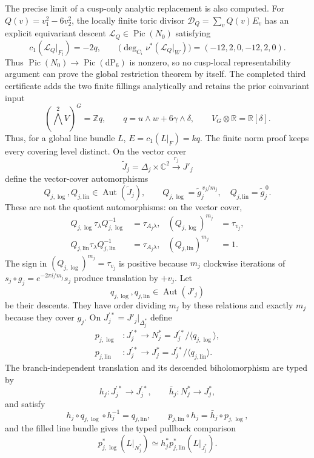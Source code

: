 \begin{enumerate}[leftmargin=1.8em,itemsep=.65em]
The precise limit of a cusp-only analytic replacement is also computed.
For $Q(v)=v_1^2-6v_2^2$, the locally finite toric divisor
$\mathcal D_Q=\sum_vQ(v)E_v$ has an explicit equivariant descent
$\mathcal L_Q\in\operatorname{Pic}(N_0)$ satisfying
\[
 c_1(\mathcal L_Q|_{F_t})=-2q,\qquad
 \bigl(\deg_{C_i}\nu^*(\mathcal L_Q|_W)\bigr)
 =(-12,2,0,-12,2,0).
\]
Thus $\operatorname{Pic}(N_0)\to\operatorname{Pic}(\mathrm{dP}_6)$ is
nonzero, so no cusp-local representability argument can prove the global
restriction theorem by itself.  The completed third certificate adds the two
finite fillings analytically and retains the prior coinvariant input
\[
 (\textstyle\bigwedge^2V)^G=\mathbb Zq,\qquad
 q=u\wedge w+6\gamma\wedge\delta,\qquad
 V_G\otimes\mathbb R=\mathbb R[\delta].
\]
Thus, for a global line bundle $L$,
$E=c_1(L|_F)=kq$.  The finite norm proof keeps every covering level
distinct.  On the vector cover
\[
 \widetilde J_j=\Delta_j\times\mathbb C^2
 \xrightarrow{\ r_j\ }J'_j
\]
define the vector-cover automorphisms
\[
 Q_{j,\log},Q_{j,\mathrm{lin}}\in\operatorname{Aut}(\widetilde J_j),
 \qquad
 Q_{j,\log}=\widetilde g_j^{\,v_j/m_j},\quad
 Q_{j,\mathrm{lin}}=\widetilde g_j^{\,0}.
\]
These are not the quotient automorphisms: on the vector cover,
\[
\begin{aligned}
 Q_{j,\log}\tau_\lambda Q_{j,\log}^{-1}
 &=\tau_{A_j\lambda},&
 (Q_{j,\log})^{m_j}&=\tau_{v_j},\\
 Q_{j,\mathrm{lin}}\tau_\lambda Q_{j,\mathrm{lin}}^{-1}
 &=\tau_{A_j\lambda},&
 (Q_{j,\mathrm{lin}})^{m_j}&=1.
\end{aligned}
\]
The sign in $(Q_{j,\log})^{m_j}=\tau_{v_j}$ is positive because
$m_j$ clockwise iterations of
$s_j\circ g_j=e^{-2\pi i/m_j}s_j$ produce translation by $+v_j$.
Let
\[
 q_{j,\log},q_{j,\mathrm{lin}}\in\operatorname{Aut}(J'_j)
\]
be their descents.  They have order dividing $m_j$ by these relations and
exactly $m_j$ because they cover $g_j$.  On
$J_j^{\prime *}=J'_j|_{\Delta_j^*}$ define
\[
\begin{aligned}
 p_{j,\log}&:J_j^{\prime *}\longrightarrow
 N_j^*=J_j^{\prime *}/\langle q_{j,\log}\rangle,\\
 p_{j,\mathrm{lin}}&:J_j^{\prime *}\longrightarrow
 J_j^*=J_j^{\prime *}/\langle q_{j,\mathrm{lin}}\rangle .
\end{aligned}
\]
The branch-independent translation and its descended biholomorphism are
typed by
\[
 h_j:J_j^{\prime *}\longrightarrow J_j^{\prime *},\qquad
 \bar h_j:N_j^*\longrightarrow J_j^*,
\]
and satisfy
\[
 h_j\circ q_{j,\log}\circ h_j^{-1}=q_{j,\mathrm{lin}},\qquad
 p_{j,\mathrm{lin}}\circ h_j=\bar h_j\circ p_{j,\log},
\]
and the filled line bundle gives the typed pullback comparison
\[
 p_{j,\log}^*(L|_{N_j^*})
 \simeq h_j^*p_{j,\mathrm{lin}}^*(L|_{J_j^*}).
\]


\end{enumerate}
